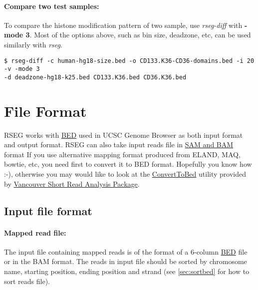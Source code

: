 \documentclass[11pt]{report}
\begin{document}
\paragraph{Compare two test samples:}
To compare the histone modification pattern of two sample, use
\textit{rseg-diff} with \textbf{-mode 3}. Most of the options above, such as bin size,
deadzone, etc, can be used similarly with \textit{rseg}.
\begin{verbatim}
$ rseg-diff -c human-hg18-size.bed -o CD133.K36-CD36-domains.bed -i 20 -v -mode 3 
-d deadzone-hg18-k25.bed CD133.K36.bed CD36.K36.bed
\end{verbatim}

\section{File Format}
\label{sec:file-format}

RSEG works with \href{http://genome.ucsc.edu/FAQ/FAQformat.html#format1}{BED}
used in UCSC Genome Browser as both input format and output format. RSEG can
also take input reads file in \href{https://github.com/samtools/samtools}{SAM
  and BAM} format If you use alternative mapping format produced from ELAND, MAQ,
bowtie, etc, you need first to convert it to BED format. Hopefully you know how
:-), otherwise you may would like to look at the
\href{http://sourceforge.net/apps/mediawiki/vancouvershortr/index.php?title=ConvertToBed}
     {ConvertToBed} utility provided by
     \href{http://sourceforge.net/projects/vancouvershortr/}{Vancouver Short
       Read Analysis Package}.


\subsection{Input file format}
\label{sec:input-file}

\paragraph{Mapped read file:} The input file containing mapped reads
is of the format of a 6-column
\href{http://genome.ucsc.edu/FAQ/FAQformat.html#format1}{BED} file or in the BAM
format. The reads in input file should be sorted by chromosome name, starting
position, ending position and strand (see \ref{sec:sortbed} for how to sort
reads file).
\end{document}
